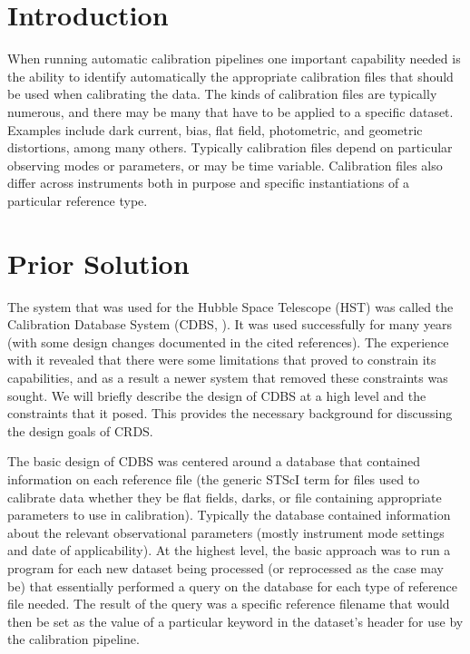 \documentclass[final,authoryear,5p,times,twocolumn]{elsarticle}
\begin{document}
\newcommand{\aspconf}{ASP Conf.\ Ser}
\newcommand{\aap}{A\&A}
\newcommand{\aaps}{A\&AS}
\newcommand{\jrasc}{JRASC}
\newcommand{\qjras}{QJRAS}
\newcommand{\mnras}{MNRAS}
\newcommand{\pasp}{PASP}
\newcommand{\pasa}{PASA}
\newcommand{\apjs}{ApJS}

\section{Introduction}

When running automatic calibration pipelines one important capability needed is
the ability to identify automatically the appropriate calibration files that
should be used when calibrating the data. The kinds of calibration files are
typically numerous, and there may be many that have to be applied to a specific
dataset. Examples include dark current, bias, flat field, photometric, and
geometric distortions, among many others. Typically calibration files depend on
particular observing modes or parameters, or may be time variable.
Calibration files also differ across instruments both in purpose and specific 
instantiations of a particular reference type.

\section{Prior Solution}

The system that was used for the Hubble Space Telescope (HST) was called the
Calibration Database System (CDBS,  
\citealt{1994Cox,1997Lubow,1998Cox,1997hstinternal,2004Swam}). It was used successfully for many years (with some design changes documented in the 
cited references). The experience with it revealed that there were some limitations that
proved to constrain its capabilities, and as a result a newer system that
removed these constraints was sought. We will briefly describe the design of
CDBS at a high level and the constraints that it posed. This provides the
necessary background for discussing the design goals of CRDS.

The basic design of CDBS was centered around a database that contained
information on each reference file (the generic STScI term for files used to
calibrate data whether they be flat fields, darks, or file containing
appropriate parameters to use in calibration). Typically the database contained
information about the relevant observational parameters (mostly instrument mode
settings and date of applicability). At the highest level, the basic approach
was to run a program for each new dataset being processed (or reprocessed as
the case may be) that essentially performed a query on the database for each
type of reference file needed. The result of the query was a specific reference
filename that would then be set as the value of a particular keyword in the
dataset's header for use by the calibration pipeline.
\end{document}
